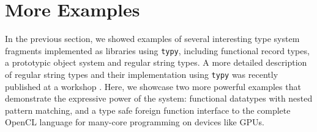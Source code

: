 \documentclass{sigplanconf}
\newcommand{\lip}[1]{\lstinline[language=Python,basicstyle=\ttfamily\small,deletendkeywords={tuple,buffer,map}]{#1}}
\begin{document}


\section{More Examples}\label{examples}
In the previous section, we showed examples of several interesting type system fragments implemented as libraries using \lip{typy}, including functional record types, a prototypic object system and regular string types. A more detailed description of regular string types and their implementation using \lip{typy} was recently published at a workshop \cite{sanitation-psp14}. Here, we showcase two more powerful examples that demonstrate the expressive power of the system: functional datatypes with nested pattern matching, and a type safe foreign function interface to the complete OpenCL language for many-core programming on devices like GPUs.
\end{document}
